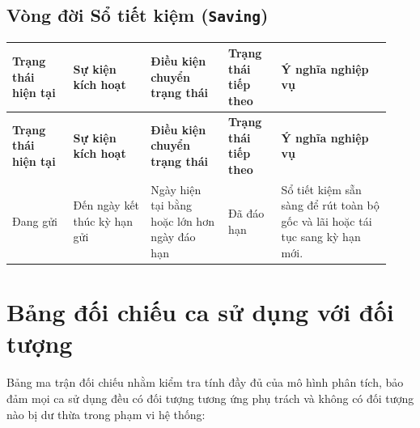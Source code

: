 \documentclass[11pt,a4paper]{article}
\newcommand{\lthead}[1]{%
  \hline#1\\\hline\endfirsthead
  \hline#1\\\hline\endhead
}
\newenvironment{smalltable}{\begingroup\footnotesize\renewcommand{\arraystretch}{1.25}\setlength{\tabcolsep}{3pt}}{\endgroup}
\begin{document}
\subsection{Vòng đời Sổ tiết kiệm (\texttt{Saving})}

\begin{smalltable}
\begin{longtable}{|L{0.15\linewidth}|L{0.19\linewidth}|L{0.19\linewidth}|L{0.13\linewidth}|L{0.27\linewidth}|}
\lthead{\textbf{Trạng thái hiện tại} & \textbf{Sự kiện kích hoạt} & \textbf{Điều kiện chuyển trạng thái} & \textbf{Trạng thái tiếp theo} & \textbf{Ý nghĩa nghiệp vụ}}
Đang gửi & Đến ngày kết thúc kỳ hạn gửi & Ngày hiện tại bằng hoặc lớn hơn ngày đáo hạn & Đã đáo hạn & Sổ tiết kiệm sẵn sàng để rút toàn bộ gốc và lãi hoặc tái tục sang kỳ hạn mới. \\ \hline
\end{longtable}
\end{smalltable}

\section{Bảng đối chiếu ca sử dụng với đối tượng}

Bảng ma trận đối chiếu nhằm kiểm tra tính đầy đủ của mô hình phân tích, bảo đảm mọi ca sử dụng đều có đối tượng tương ứng phụ trách và không có đối tượng nào bị dư thừa trong phạm vi hệ thống:
\end{document}
